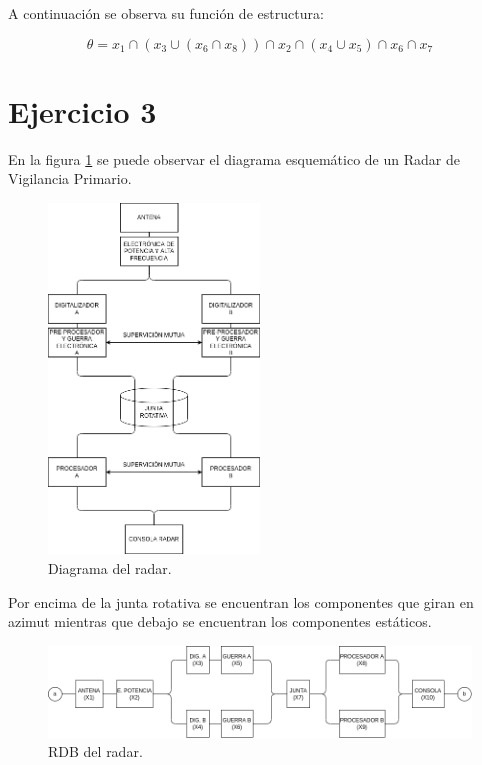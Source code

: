 \documentclass[
    11pt,
    spanish,
    a4paper
]{article}
\begin{document}
A continuación se observa su función de estructura:

\begin{dmath}
	\theta = x_1 \cap (x_3 \cup (x_6 \cap x_8) ) \cap x_2 \cap (x_4 \cup x_5) \cap x_6 \cap x_7
\end{dmath}

\newpage

\section{Ejercicio 3}

En la figura \ref{fig:radar} se puede observar el diagrama esquemático de un Radar de Vigilancia Primario.

\begin{figure}[htbp]
	\centering
	\includegraphics[width=0.5\textwidth]{img/radar.png}
	\caption{Diagrama del radar.}
	\label{fig:radar}
\end{figure}

Por encima de la junta rotativa se encuentran los componentes que giran en azimut mientras que debajo se encuentran los componentes estáticos.

\begin{figure}[htbp]
	\centering
	\includegraphics[width=\textwidth]{img/rdb_radar.png}
	\caption{RDB del radar.}
	\label{fig:rdb_radar}
\end{figure}
\end{document}
